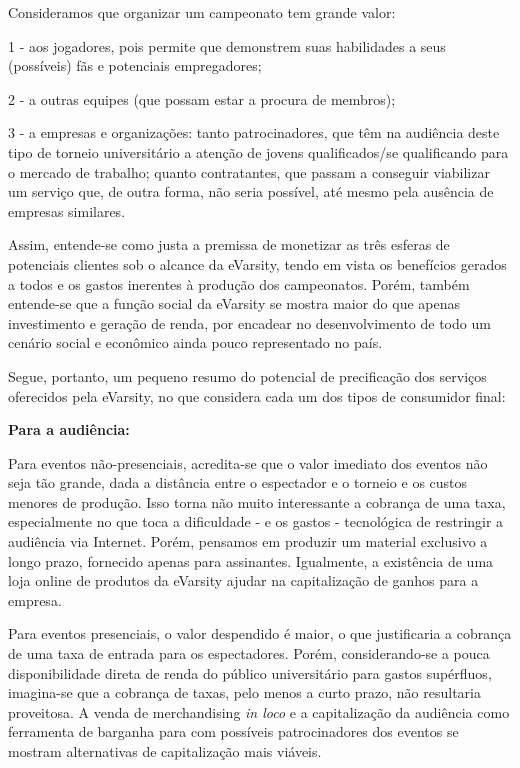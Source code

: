 \documentclass[a4paper, 12pt]{paper}
\begin{document}
Consideramos que organizar um campeonato tem grande valor:

1 - aos jogadores, pois permite que demonstrem suas habilidades a seus (possíveis) fãs e potenciais empregadores;

2 - a outras equipes (que possam estar a procura de membros);

3 - a empresas e organizações: tanto patrocinadores, que têm na audiência deste tipo de torneio universitário a atenção de jovens qualificados/se qualificando para o mercado de trabalho; quanto contratantes, que passam a conseguir viabilizar um serviço que, de outra forma, não seria possível, até mesmo pela ausência de empresas similares.

Assim, entende-se como justa a premissa de monetizar as três esferas de potenciais clientes sob o alcance da eVarsity, tendo em vista os benefícios gerados a todos e os gastos inerentes à produção dos campeonatos. Porém, também entende-se que a função social da eVarsity se mostra maior do que apenas investimento e geração de renda, por encadear no desenvolvimento de todo um cenário social e econômico ainda pouco representado no país.

Segue, portanto, um pequeno resumo do potencial de precificação dos serviços oferecidos pela eVarsity, no que considera cada um dos tipos de consumidor final:

\textbf{Para a audiência:}

Para eventos não-presenciais, acredita-se que o valor imediato dos eventos não seja tão grande, dada a distância entre o espectador e o torneio e os custos menores de produção. Isso torna não muito interessante a cobrança de uma taxa, especialmente no que toca a dificuldade - e os gastos -  tecnológica de restringir a audiência via Internet. Porém, pensamos em produzir um material exclusivo a longo prazo, fornecido apenas para assinantes. Igualmente, a existência de uma loja online de produtos da eVarsity ajudar na capitalização de ganhos para a empresa.

Para eventos presenciais, o valor despendido é maior, o que justificaria a cobrança de uma taxa de entrada para os espectadores. Porém, considerando-se a pouca disponibilidade direta de renda do público universitário para gastos supérfluos, imagina-se que a cobrança de taxas, pelo menos a curto prazo, não resultaria proveitosa. A venda de merchandising \textit{in loco} e a capitalização da audiência como ferramenta de barganha para com possíveis patrocinadores dos eventos se mostram alternativas de capitalização mais viáveis.
\end{document}

